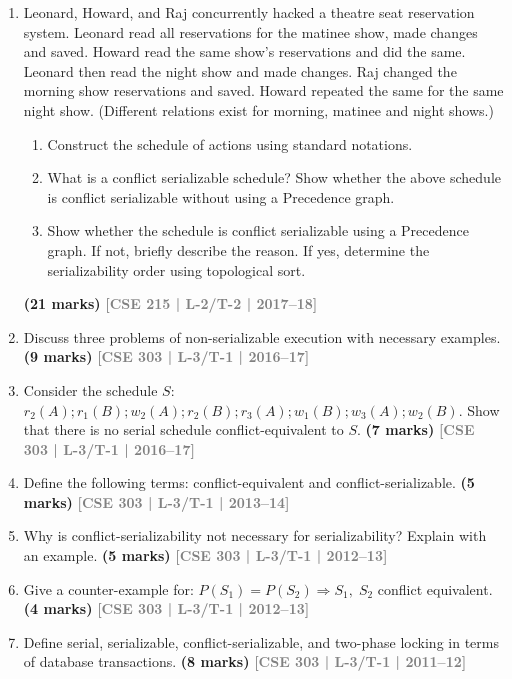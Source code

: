 \documentclass[12pt]{article}
\newcommand{\yr}[1]{\hfill\textcolor{gray}{\small\textbf{[#1]}}}
\newcommand{\mk}[1]{\textcolor{orange!70!black}{\small\textbf{(#1 marks)}}}
\begin{document}
\begin{enumerate}

\item Leonard, Howard, and Raj concurrently hacked a theatre seat reservation system. Leonard read all reservations for the matinee show, made changes and saved. Howard read the same show's reservations and did the same. Leonard then read the night show and made changes. Raj changed the morning show reservations and saved. Howard repeated the same for the same night show. (Different relations exist for morning, matinee and night shows.)
\begin{enumerate}
  \item Construct the schedule of actions using standard notations.
  \item What is a conflict serializable schedule? Show whether the above schedule is conflict serializable without using a Precedence graph.
  \item Show whether the schedule is conflict serializable using a Precedence graph. If not, briefly describe the reason. If yes, determine the serializability order using topological sort.
\end{enumerate}
  \mk{21} \yr{CSE 215 | L-2/T-2 | 2017--18}


\item Discuss three problems of non-serializable execution with necessary examples.
\mk{9} \yr{CSE 303 | L-3/T-1 | 2016--17}


\item Consider the schedule $S$: $r_2(A); r_1(B); w_2(A); r_2(B); r_3(A); w_1(B); w_3(A); w_2(B)$. Show that there is no serial schedule conflict-equivalent to $S$.
\mk{7} \yr{CSE 303 | L-3/T-1 | 2016--17}


\item Define the following terms: conflict-equivalent and conflict-serializable.
\mk{5} \yr{CSE 303 | L-3/T-1 | 2013--14}


\item Why is conflict-serializability not necessary for serializability? Explain with an example.
\mk{5} \yr{CSE 303 | L-3/T-1 | 2012--13}


\item Give a counter-example for: $P(S_1) = P(S_2) \Rightarrow S_1,\;S_2$ conflict equivalent.
\mk{4} \yr{CSE 303 | L-3/T-1 | 2012--13}


\item Define serial, serializable, conflict-serializable, and two-phase locking in terms of database transactions.
\mk{8} \yr{CSE 303 | L-3/T-1 | 2011--12}

\end{enumerate}
\end{document}
